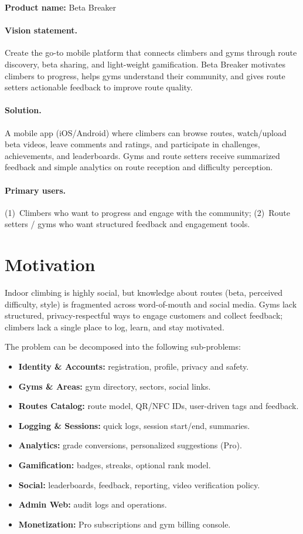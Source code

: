 \documentclass[12pt,a4paper]{report}
\renewcommand\_{\textunderscore\hspace{0pt}}
\begin{document}
\textbf{Product name:} Beta Breaker

\paragraph{Vision statement.} Create the go-to mobile platform that connects climbers and gyms through route discovery, beta sharing, and light-weight gamification. Beta Breaker motivates climbers to progress, helps gyms understand their community, and gives route setters actionable feedback to improve route quality.

\paragraph{Solution.} A mobile app (iOS/Android) where climbers can browse routes, watch/upload beta videos, leave comments and ratings, and participate in challenges, achievements, and leaderboards. Gyms and route setters receive summarized feedback and simple analytics on route reception and difficulty perception.

\paragraph{Primary users.} (1)~Climbers who want to progress and engage with the community; (2)~Route setters / gyms who want structured feedback and engagement tools.

\section{Motivation}

Indoor climbing is highly social, but knowledge about routes (beta, perceived difficulty, style) is fragmented across word-of-mouth and social media. Gyms lack structured, privacy-respectful ways to engage customers and collect feedback; climbers lack a single place to log, learn, and stay motivated.

The problem can be decomposed into the following sub-problems:

\begin{itemize}[noitemsep]
    \item \textbf{Identity \& Accounts:} registration, profile, privacy and safety.
    \item \textbf{Gyms \& Areas:} gym directory, sectors, social links.
    \item \textbf{Routes Catalog:} route model, QR/NFC IDs, user-driven tags and feedback.
    \item \textbf{Logging \& Sessions:} quick logs, session start/end, summaries.
    \item \textbf{Analytics:} grade conversions, personalized suggestions (Pro).
    \item \textbf{Gamification:} badges, streaks, optional rank model.
    \item \textbf{Social:} leaderboards, feedback, reporting, video verification policy.
    \item \textbf{Admin Web:} audit logs and operations.
    \item \textbf{Monetization:} Pro subscriptions and gym billing console.
\end{itemize}
\end{document}

